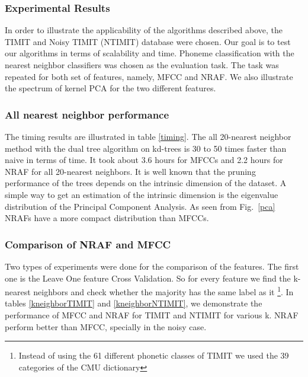 \documentclass[12pt,letterpaper,doublespaced,ETD,dvips,proposal]{gtthesis}
\begin{document}
\begin{Body}






\subsubsection{Experimental Results} In order to illustrate the
applicability of the algorithms described above, the TIMIT and Noisy
TIMIT (NTIMIT) database were chosen. Our goal is to test our
algorithms in terms of scalability and time. Phoneme classification
with the nearest neighbor classifiers was chosen as the evaluation
task. The task was repeated for both set of features, namely, MFCC
and NRAF. We also illustrate the spectrum of kernel PCA for the two
different features.

\subsubsection{All nearest neighbor performance}
The timing results are illustrated in table \ref{timing}. The all
20-nearest neighbor method with the dual tree algorithm on kd-trees
is 30 to 50 times faster than naive in terms of time. It took about
3.6 hours for MFCCs and 2.2 hours for NRAF for all 20-nearest
neighbors. It is well known that the pruning performance of the
trees depends on the intrinsic dimension of the dataset. A simple
way to get an estimation of the intrinsic dimension is the
eigenvalue distribution of the Principal Component Analysis. As seen
from Fig.~\ref{pca} NRAFs have a more compact distribution than
MFCCs.

\subsubsection{Comparison of NRAF and MFCC} Two types of
experiments were done for the comparison of the features. The first
one is the Leave One feature Cross Validation. So for every feature
we find the k-nearest neighbors and check whether the majority has
the same label as it \footnote{Instead of using the 61 different
phonetic classes of TIMIT we used the 39 categories of the CMU
dictionary}. In tables \ref{kneighborTIMIT} and
\ref{kneighborNTIMIT}, we demonstrate the performance of MFCC and
NRAF for TIMIT and NTIMIT for various k. NRAF perform better than
MFCC, specially in the noisy case.


\end{Body}
\end{document}
